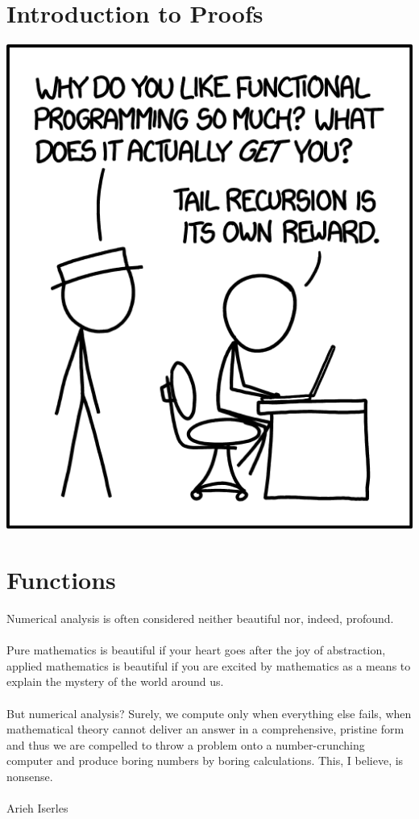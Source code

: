 \documentclass[oneside]{book}
\begin{document}
\chapter{Introduction to Proofs} \label{appendix:a}

    

\begin{savequote}
    \includegraphics[scale=0.7]{Graphics/functions.png}
\end{savequote}
\chapter{Functions} \label{appendix:b}

    

\begin{savequote}
    Numerical analysis is often considered neither beautiful nor, indeed, profound. 
    \\
    \\
    Pure mathematics is beautiful if your heart goes after the joy of abstraction, applied mathematics is beautiful if you are excited by mathematics as a means to explain the mystery of the world around us.
    \\
    \\
    But numerical analysis? Surely, we compute only when everything else fails, when mathematical theory cannot deliver an answer in a comprehensive, pristine form and thus we are compelled to throw a problem onto a number-crunching computer and produce boring numbers by boring calculations. This, I believe, is nonsense.
    \\
    \\
    Arieh Iserles
\end{savequote}
\end{document}
